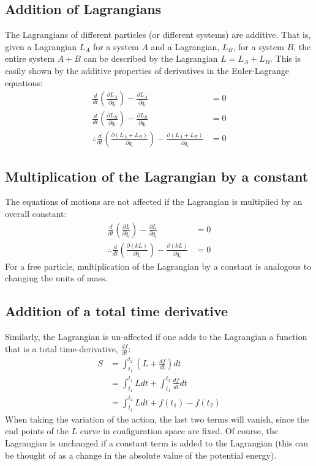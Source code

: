 \subsection{Addition of Lagrangians}
The Lagrangians of different particles (or different systems) are additive. That is, given a Lagrangian $L_A$ for a system $A$ and a Lagrangian, $L_B$, for a system $B$, the entire system $A+B$ can be described by the Lagrangian $L=L_A+L_B$. This is easily shown by the additive properties of derivatives in the Euler-Lagrange equations:
\begin{align}
\frac{d}{dt}\left(\frac{\partial L_A}{\partial \dot{q_i}} \right) - \frac{\partial L_A}{\partial q_i}&=0\nonumber\\
\frac{d}{dt}\left(\frac{\partial L_B}{\partial \dot{q_i}} \right) - \frac{\partial L_B}{\partial q_i}&=0\nonumber\\
\therefore \frac{d}{dt}\left(\frac{\partial (L_A+L_B)}{\partial \dot{q_i}} \right) - \frac{\partial (L_A+L_B)}{\partial q_i}&=0
\end{align}
\subsection{Multiplication of the Lagrangian by a constant}
The equations of motions are not affected if the Lagrangian is multiplied by an overall constant:
\begin{align}
\frac{d}{dt}\left(\frac{\partial L}{\partial \dot{q_i}} \right) - \frac{\partial L}{\partial q_i}&=0\nonumber\\
\therefore\frac{d}{dt}\left(\frac{\partial (kL)}{\partial \dot{q_i}} \right) - \frac{\partial (kL)}{\partial q_i}&=0
\end{align}
For a free particle, multiplication of the Lagrangian by a constant is analogous to changing the units of mass.
\subsection{Addition of a total time derivative }
Similarly, the Lagrangian is un-affected if one adds to the Lagrangian a function that is a total time-derivative, $\frac{df}{dt}$:
\begin{align}
S&=\int_{t_1}^{t_2} \left(L+\frac{df}{dt}\right) dt\nonumber\\
&=\int_{t_1}^{t_2} Ldt+\int_{t_1}^{t_2}\frac{df}{dt}dt\nonumber\\
&=\int_{t_1}^{t_2} Ldt +f(t_1)-f(t_2)
\end{align}
When taking the variation of the action, the last two terms will vanish, since the end points of the $L$ curve in configuration space are fixed. Of course, the Lagrangian is unchanged if a constant term is added to the Lagrangian (this can be thought of as a change in the absolute value of the potential energy).

